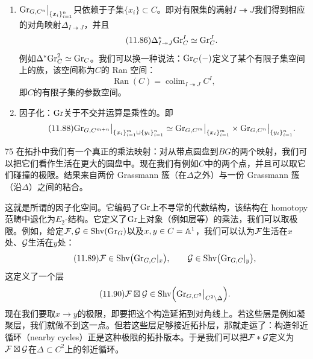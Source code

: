 \begin{enumerate}
\item $\mathrm{Gr}_{G,C^{n}}\big|_{\{x_i\}_{i=1}^{n}}$只依赖于子集$\{x_i\}\subset C$。即对有限集的满射$I\twoheadrightarrow J$我们得到相应的对角映射$\Delta_{I\twoheadrightarrow J}$，并且
\begin{equation}\tag{11.86}
\Delta^{*}_{I\twoheadrightarrow J}\mathrm{Gr}_{C}^{I}\simeq\mathrm{Gr}_{C}^{J}.
\end{equation}
例如$\Delta^{*}\mathrm{Gr}_{C}^{2}\simeq\mathrm{Gr}_{C}$。我们可以换一种说法：$\mathrm{Gr}_{C}(-)$定义了某个有限子集空间上的族，该空间称为$C$的 Ran 空间：
\begin{equation}\tag{11.87}
\operatorname{Ran}(C)=\operatorname{colim}_{I\twoheadrightarrow J}C^{I},
\end{equation}
即$C$的有限子集的参数空间。

\item 因子化：$\mathrm{Gr}$关于不交并运算是乘性的。即
\begin{equation}\tag{11.88}
\mathrm{Gr}_{G,C^{m+n}}\big|_{\{x_i\}_{i=1}^{m}\sqcup\{y_i\}_{i=1}^{n}}\simeq\mathrm{Gr}_{G,C^{m}}\big|_{\{x_i\}_{i=1}^{m}}\times\mathrm{Gr}_{G,C^{n}}\big|_{\{y_i\}_{i=1}^{n}}.
\end{equation}
\end{enumerate}

\begin{srcrem}{75}
在拓扑中我们有一个真正的乘法映射：对从带点圆盘到$BG$的两个映射，我们可以把它们看作生活在更大的圆盘中。现在我们有例如$C$中的两个点，并且可以取它们碰撞的极限。结果来自两份 Grassmann 簇（在$\Delta$之外）与一份 Grassmann 簇（沿$\Delta$）之间的粘合。
\end{srcrem}

这就是所谓的因子化空间。它编码了$\mathrm{Gr}$上不寻常的代数结构，该结构在 homotopy 范畴中退化为$E_2$-结构。它定义了$\mathrm{Gr}$上对象（例如层等）的乘法，我们可以取极限。例如，给定$\mathcal{F},\mathcal{G}\in\mathrm{Shv}(\mathrm{Gr}_G)$以及$x,y\in C=\mathbb{A}^1$，我们可以认为$\mathcal{F}$生活在$x$处、$\mathcal{G}$生活在$y$处：
\begin{equation}\tag{11.89}
\mathcal{F}\in\mathrm{Shv}\bigl(\mathrm{Gr}_{G,C}|_{x}\bigr),\qquad \mathcal{G}\in\mathrm{Shv}\bigl(\mathrm{Gr}_{G,C}|_{y}\bigr),
\end{equation}
这定义了一个层
\begin{equation}\tag{11.90}
\mathcal{F}\boxtimes\mathcal{G}\in\mathrm{Shv}\Bigl(\mathrm{Gr}_{G,C^{2}}\big|_{C^{2}\setminus\Delta}\Bigr).
\end{equation}
现在我们要取$x\to y$的极限，即要把这个构造延拓到对角线上。若这些层是例如凝聚层，我们就做不到这一点。但若这些层足够接近拓扑层，那就走运了：构造邻近循环（nearby cycles）正是这种极限的拓扑版本。于是我们可以把$\mathcal{F}*\mathcal{G}$定义为$\mathcal{F}\boxtimes\mathcal{G}$在$\Delta\subset C^{2}$上的邻近循环。

